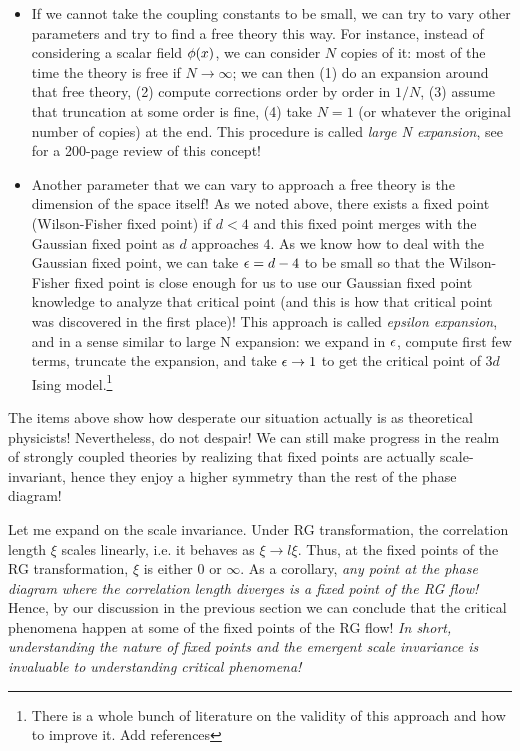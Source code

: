 \documentclass[12pt]{article}
\newcommand\draftnote[1]{{\color{blue} #1}}
\numberwithin{equation}{section}
\begin{document}
\begin{itemize}
	\item If we cannot take the coupling constants to be small, we can try to vary other parameters and try to find a free theory this way. For instance, instead of considering a scalar field $\phi(x)$, we can consider $N$ copies of it: most of the time the theory is free if $N\rightarrow\infty$; we can then (1) do an expansion around that free theory, (2) compute corrections order by order in $1/N$, (3) assume that truncation at some order is fine, (4) take $N=1$ (or whatever the original number of copies) at the end. This procedure is called \emph{large N expansion}, see \cite{Moshe:2003xn} for a 200-page review of this concept!
	
	\item Another parameter that we can vary to approach a free theory is the dimension of the space itself! As we noted above, there exists a fixed point (Wilson-Fisher fixed point) if $d<4$ and this fixed point merges with the Gaussian fixed point as $d$ approaches $4$. As we know how to deal with the Gaussian fixed point, we can take $\epsilon=d-4$ to be small so that the Wilson-Fisher fixed point is close enough for us to use our Gaussian fixed point knowledge to analyze that critical point (and this is how that critical point was discovered in the first place)! This approach is called \emph{epsilon expansion}, and in a sense similar to large N expansion: we expand in $\epsilon$, compute first few terms, truncate the expansion, and take $\epsilon\rightarrow1$ to get the critical point of $3d$ Ising model.\footnote{There is a whole bunch of literature on the validity of this approach and how to improve it. \draftnote{Add references}}
\end{itemize}

The items above show how desperate our situation actually is as theoretical physicists! Nevertheless, do not despair! We can still make progress in the realm of strongly coupled theories by realizing that fixed points are actually scale-invariant, hence they enjoy a higher symmetry than the rest of the phase diagram!

Let me expand on the scale invariance. Under RG transformation, the correlation length $\xi$ scales linearly, i.e. it behaves as $\xi\rightarrow l \xi$. Thus, at the fixed points of the RG transformation, $\xi$ is either $0$ or $\infty$. As a corollary, \emph{any point at the phase diagram where the correlation length diverges is a fixed point of the RG flow!} Hence, by our discussion in the previous section we can conclude that the critical phenomena happen at some of the fixed points of the RG flow! \emph{ In short, understanding the nature of fixed points and the emergent scale invariance is invaluable to understanding critical phenomena!}
\end{document}
